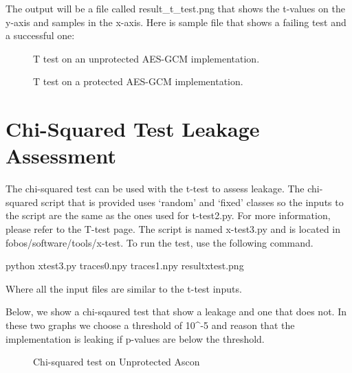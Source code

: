 \documentclass[letterpaper,10pt,english]{sphinxmanual}
\let\sphinxpxdimen\pdfpxdimen\else\newdimen\sphinxpxdimen
\begin{document}
The output will be a file called result\_t\_test.png that shows the t-values on the y-axis and samples in the x-axis.
Here is sample file that shows a failing test and a successful one:

\begin{figure}[htbp]
\centering
\capstart

\noindent{}
\caption{T test on an unprotected AES-GCM implementation.}\label{\detokenize{t_test:id2}}\end{figure}

\begin{figure}[htbp]
\centering
\capstart

\noindent{}
\caption{T test on a protected AES-GCM implementation.}\label{\detokenize{t_test:id3}}\end{figure}


\chapter{Chi-Squared Test Leakage Assessment}
\label{\detokenize{x_test:chi-squared-test-leakage-assessment}}\label{\detokenize{x_test::doc}}
The chi-squared test can be used with the t-test to assess leakage.
The chi-squared script that is provided uses ‘random’ and ‘fixed’ classes so the inputs
to the script are the same as the ones used for t-test2.py. For more information, please refer
to the T-test page.
The script is named x-test3.py and is located in fobos/software/tools/x-test.
To run the test, use the following command.

\begin{sphinxVerbatim}[commandchars=\\\{\}]
python x\PYGZhy{}test3.py traces0.npy traces1.npy result\PYGZus{}x\PYGZus{}test.png
\end{sphinxVerbatim}

Where all the input files are similar to the t-test inputs.

Below, we show a chi-sqaured test that show a leakage and one that does not. In these two graphs we
choose a threshold of 10\textasciicircum{}-5 and reason that the implementation is leaking if p-values are below the threshold.

\begin{figure}[htbp]
\centering
\capstart

\noindent\sphinxincludegraphics[height=350\sphinxpxdimen]{{x_test_ascon_unpr_s6_new}.png}
\caption{Chi-squared test on Unprotected Ascon}\label{\detokenize{x_test:id1}}\end{figure}
\end{document}

